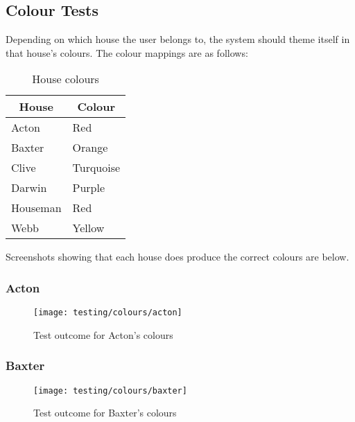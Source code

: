 \subsection{Colour Tests} %
\label{sub:colour_tests}
Depending on which house the user belongs to, the system should theme itself in that house's colours. The colour mappings are as follows:

\begin{table}[!htbp]
\centering
\begin{tabular}{|l|l|}
\hline
\multicolumn{1}{|c|}{\textbf{House}} & \multicolumn{1}{c|}{\textbf{Colour}} \\ \hline
Acton                                & Red                                  \\ \hline
Baxter                               & Orange                               \\ \hline
Clive                                & Turquoise                            \\ \hline
Darwin                               & Purple                               \\ \hline
Houseman                             & Red                                  \\ \hline
Webb                                 & Yellow                               \\ \hline
\end{tabular}
\caption{House colours}
\end{table}

Screenshots showing that each house does produce the correct colours are below.

\subsubsection{Acton} %
\label{ssub:acton}
\begin{figure}[!htbp]
  \texttt{[image: testing/colours/acton]}
  \caption{Test outcome for Acton's colours}
\end{figure}

\subsubsection{Baxter} %
\label{ssub:baxter}
\begin{figure}[!htbp]
  \texttt{[image: testing/colours/baxter]}
  \caption{Test outcome for Baxter's colours}
\end{figure}

